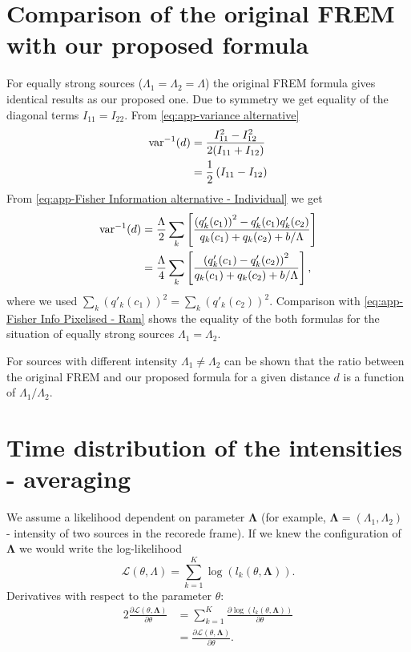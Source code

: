 \section{Comparison of the original FREM with our proposed formula}
For equally strong sources ($\Lambda_1= \Lambda_2=\Lambda$) the original FREM formula gives identical results as our proposed one. Due to symmetry we get equality of the diagonal terms $I_{11}=I_{22}$. From \autoref{eq:app-variance alternative}
\begin{alignat}{2}
	\mathrm{var}^{-1}(d)
	&=\frac{I_{11}^2-I_{12}^2}{2(I_{11}+I_{12})}\nonumber\\
	&=\frac{1}{2}\left(I_{11}-I_{12}\right)
\end{alignat}
%
From  \autoref{eq:app-Fisher Information alternative - Individual} we get
\begin{alignat}{2}
	\mathrm{var}^{-1}(d)
	&=\frac{\Lambda}{2}\sum_k\left[\frac{\left(q'_k(c_1)\right)^2-q'_k(c_1)q'_k(c_2)}{q_k(c_1)+q_k(c_2)+b/\Lambda} \right]\nonumber\\
	&=\frac{\Lambda}{4}\sum_k\left[\frac{\left(q'_k(c_1)-q'_k(c_2)\right)^2}{q_k(c_1)+q_k(c_2)+b/\Lambda} \right],
\end{alignat}
% 
where we used $\sum_k\left(q'_k(c_1)\right)^2=\sum_k\left(q'_k(c_2)\right)^2$. Comparison with \autoref{eq:app-Fisher Info Pixelised - Ram} shows the equality of the both formulas for the situation of equally strong sources $\Lambda_1=\Lambda_2$.

For sources with different intensity $\Lambda_1\neq\Lambda_2$ can be shown that the ratio between the original FREM and our proposed formula for a given distance $d$ is a function of $\Lambda_1/\Lambda_2$. 


\section{Time distribution of the intensities - averaging\label{sec:Appendix - blinking not integrated}}
We assume a likelihood dependent on parameter $\bm{\Lambda}$ (for example, $\bm{\Lambda}=(\Lambda_1,\Lambda_2)$ - intensity of two sources in the recorede frame). If we knew the configuration of $\bm{\Lambda}$ we would write the log-likelihood
%
\begin{equation}
	\mathcal{L}(\theta,\Lambda)=\sum_{k=1}^K\log\left(l_k(\theta,\bm{\Lambda})\right).
\end{equation}
%
Derivatives with respect to the parameter $\theta$:
%
\begin{alignat*}{2}
	\frac{\partial\mathcal{L}(\theta,\bm{\Lambda})}{\partial \theta}
	&=\sum_{k=1}^K\frac{\partial\log\left(l_k(\theta,\bm{\Lambda})\right)}{\partial \theta}\\
	&=\frac{\partial\mathcal{L}(\theta,\bm{\Lambda})}{\partial \theta}. 
\end{alignat*}

